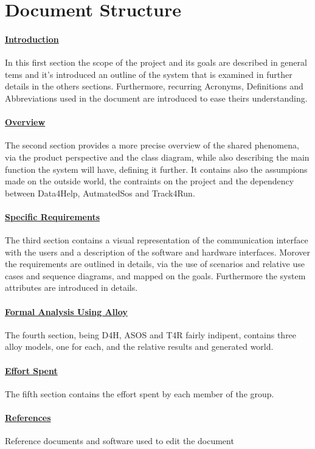 \section{Document Structure}
\paragraph{\hyperref[sect:introduction]{Introduction}} In this first section the scope of the project and its goals are described in general tems and it's introduced an outline of the system that is examined in further details in the others sections. Furthermore, recurring Acronyms, Definitions and Abbreviations used in the document are introduced to ease theirs understanding.
\paragraph{\hyperref[sect:overview]{Overview}} The second section provides a more precise overview of the shared phenomena, via the product perspective and the class diagram, while also describing the main function the system will have, defining it further. It contains also the assumpions made on the outside world, the contraints on the project and the dependency between Data4Help, AutmatedSos and Track4Run.
\paragraph{\hyperref[sect:requirements]{Specific Requirements}} The third section contains a visual representation of the communication interface with the users and a description of the software and hardware interfaces. Morover the requirements are outlined in details, via the use of scenarios and relative use cases and sequence diagrams, and mapped on the goals. Furthermore the system attributes are introduced in details.
\paragraph{\hyperref[sect:alloy]{Formal Analysis Using Alloy}} The fourth section, being D4H, ASOS and T4R fairly indipent, contains three alloy models, one for each, and the relative results and generated world.
\paragraph{\hyperref[sect:effort]{Effort Spent}} The fifth section contains the effort spent by each member of the group.
\paragraph{\hyperref[sect:references]{References}} Reference documents and software used to edit the document


